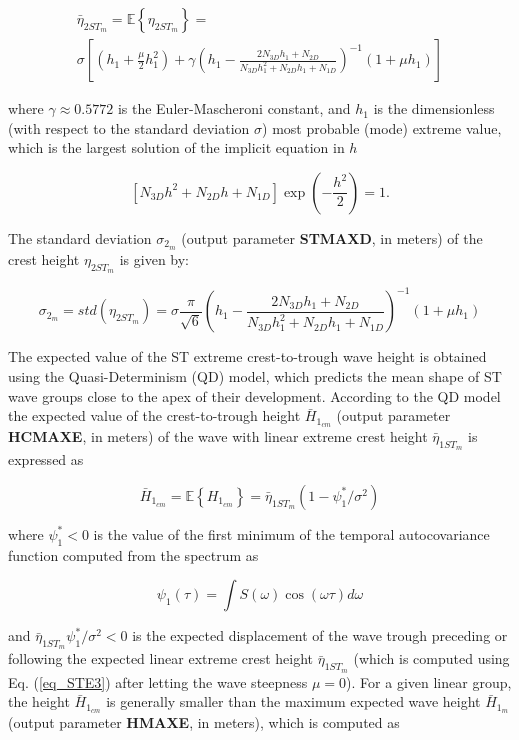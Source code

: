 \begin{multline}
\bar{\eta}_{2ST_m}=\mathbb{E}\left\{\eta_{2ST_m} \right\} = \\ 
	\sigma \left[(h_1+\frac{\mu}{2}h_1^{2})+
\gamma \left( h_1-\frac{2N_{3D}h_1+N_{2D}}{N_{3D} h_1^{2}+N_{2D} h_1+N_{1D}}\right)^{-1} (1+\mu h_1) \right]
\label{eq_STE3}
\end{multline}

where $\gamma \approx 0.5772$ is the Euler-Mascheroni constant, and $h_1$ is the dimensionless (with respect to the standard deviation $\sigma$) most probable (mode) extreme value, which is the largest solution of the implicit equation in $h$

\begin{equation}
\left[N_{3D} h^{2} + N_{2D} h + N_{1D} \right] \exp{ \left( -\frac{h^2}{2} \right)}=1.
\label{eq_STE4}
\end{equation}

The standard deviation $\sigma_{2_m}$ (output parameter \textbf{STMAXD}, in meters) of the crest height $\eta_{2ST_m}$ is given by:

\begin{equation}
\sigma_{2_m}=std(\eta_{2ST_m})=\sigma \frac{\pi}{\sqrt{6}} \left( h_1-\frac{2N_{3D}h_1+N_{2D}}{N_{3D} h_1^{2}+N_{2D} h_1+N_{1D}}\right)^{-1} (1+\mu h_1) 
\label{eq_STE5}
\end{equation}

The expected value of the ST extreme crest-to-trough wave height is obtained using the Quasi-Determinism (QD) model, which predicts the mean shape of ST wave groups close to the apex of their development. According to the QD model the expected value of the crest-to-trough height $\bar{H}_{1_{cm}}$ (output parameter \textbf{HCMAXE}, in meters) of the wave with linear extreme crest height $\bar{\eta}_{1ST_m}$ is expressed as

\begin{equation}
\bar{H}_{1_{cm}}=\mathbb{E}\left\{H_{1_{cm}} \right\} = \bar{\eta}_{1ST_m}(1-\psi_1^* / \sigma^2)
\label{eq_STE6}
\end{equation}

where $\psi_1^* < 0$ is the value of the first minimum of the temporal autocovariance function computed from the spectrum as

\begin{equation}
\psi_1(\tau) = \int S(\omega) \cos{(\omega \tau)} d \omega
\label{eq_STE7}
\end{equation}

and $\bar{\eta}_{1ST_m}  \psi_1^*/\sigma^2 < 0$ is the expected displacement of the wave trough preceding or following the expected linear extreme crest height $\bar{\eta}_{1ST_m}$ (which is computed using Eq. (\ref{eq_STE3}) after letting the wave steepness $\mu=0$). For a given linear group, the height $\bar{H}_{1_{cm}}$ is generally smaller than the maximum expected wave height $\bar{H}_{1_m}$ (output parameter \textbf{HMAXE}, in meters), which is computed as

